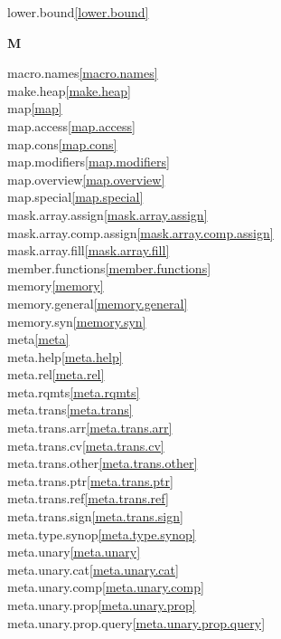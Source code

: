 \begin{multicols}{2}
lower.bound\quad\ref{lower.bound}\\
\par \textbf{M}\par
macro.names\quad\ref{macro.names}\\
make.heap\quad\ref{make.heap}\\
map\quad\ref{map}\\
map.access\quad\ref{map.access}\\
map.cons\quad\ref{map.cons}\\
map.modifiers\quad\ref{map.modifiers}\\
map.overview\quad\ref{map.overview}\\
map.special\quad\ref{map.special}\\
mask.array.assign\quad\ref{mask.array.assign}\\
mask.array.comp.assign\quad\ref{mask.array.comp.assign}\\
mask.array.fill\quad\ref{mask.array.fill}\\
member.functions\quad\ref{member.functions}\\
memory\quad\ref{memory}\\
memory.general\quad\ref{memory.general}\\
memory.syn\quad\ref{memory.syn}\\
meta\quad\ref{meta}\\
meta.help\quad\ref{meta.help}\\
meta.rel\quad\ref{meta.rel}\\
meta.rqmts\quad\ref{meta.rqmts}\\
meta.trans\quad\ref{meta.trans}\\
meta.trans.arr\quad\ref{meta.trans.arr}\\
meta.trans.cv\quad\ref{meta.trans.cv}\\
meta.trans.other\quad\ref{meta.trans.other}\\
meta.trans.ptr\quad\ref{meta.trans.ptr}\\
meta.trans.ref\quad\ref{meta.trans.ref}\\
meta.trans.sign\quad\ref{meta.trans.sign}\\
meta.type.synop\quad\ref{meta.type.synop}\\
meta.unary\quad\ref{meta.unary}\\
meta.unary.cat\quad\ref{meta.unary.cat}\\
meta.unary.comp\quad\ref{meta.unary.comp}\\
meta.unary.prop\quad\ref{meta.unary.prop}\\
meta.unary.prop.query\quad\ref{meta.unary.prop.query}\\

\end{multicols}
